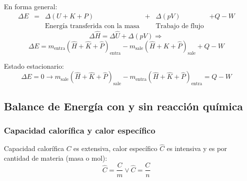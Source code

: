         En forma general:
        \begin{equation}
        \label{eq:energia_sis_abierto}
            \begin{matrix}
                 \Delta E & = & \Delta \left ( U + K + P \right ) & + & \Delta \left ( pV \right ) & + Q - W \\
                  & & \text{Energía transferida con la masa} & & \text{Trabajo de flujo} &
            \end{matrix}
        \end{equation}
        \[\Delta \widehat{H} = \Delta \widehat{U} + \Delta \left ( pV \right ) \Rightarrow\]
        \[\Delta E = m_{\text{entra}} \left ( \widehat{H} + \widehat{K} + \widehat{P} \right )_{\text{entra}} - m_{\text{sale}} \left ( \widehat{H} + \widehat{K} + \widehat{P} \right )_{\text{sale}} + Q - W\]
        
        Estado estacionario:
        \begin{equation}
        \label{eq:energia_sis_abierto_estacionario}
            \Delta E = 0 \rightarrow m_{\text{sale}} \left ( \widehat{H} + \widehat{K} + \widehat{P} \right )_{\text{sale}} - m_{\text{entra}} \left ( \widehat{H} + \widehat{K} + \widehat{P} \right )_{\text{entra}} = Q - W
        \end{equation}
    
    \subsection{Balance de Energía con y sin reacción química}
    
        \subsubsection{Capacidad calorífica y calor específico}
        
        Capacidad calorífica \(C\) es extensiva, calor específico \(\widehat{C}\) es intensiva y es por cantidad de materia (masa o mol):
        \[\widehat{C} = \frac{C}{m} \vee \widehat{C} = \frac{C}{n}\]
        
            
            \begin{quote}
                \textit{}
            \end{quote}
            
